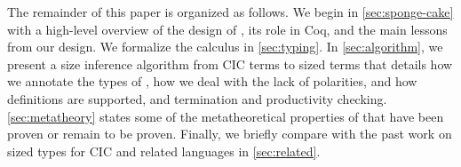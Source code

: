 The remainder of this paper is organized as follows.
We begin in \autoref{sec:sponge-cake} with a high-level overview of the design of \lang, its role in Coq, and the main lessons from our design.
We formalize the calculus \lang in \autoref{sec:typing}.
In \autoref{sec:algorithm}, we present a size inference algorithm from CIC terms to sized \lang terms that details how we annotate the types of \cofixpoints, how we deal with the lack of polarities, and how definitions are supported, and termination and productivity checking.
\autoref{sec:metatheory} states some of the metatheoretical properties of \lang that have been proven or remain to be proven.
Finally, we briefly compare with the past work on sized types for CIC and related languages in \autoref{sec:related}.
